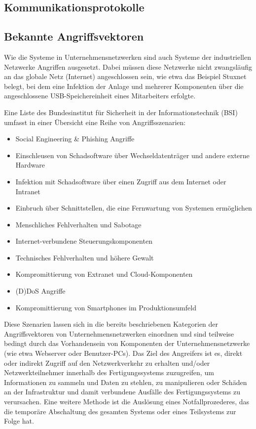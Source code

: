 \subsection{Kommunikationsprotokolle	}

\subsection{Bekannte Angriffsvektoren}
Wie die Systeme in Unternehmensnetzwerken sind auch Systeme der industriellen Netzwerke Angriffen ausgesetzt. Dabei müssen diese Netzwerke nicht zwangsläufig an das globale Netz (Internet) angeschlossen sein, wie etwa das Beispiel Stuxnet belegt, bei dem eine Infektion der Anlage und mehrerer Komponenten über die angeschlossene USB-Speichereinheit eines Mitarbeiters erfolgte.

Eine Liste des Bundesinstitut für Sicherheit in der Informationstechnik (BSI) \citep{IndAttVec1} umfasst in einer Übersicht eine Reihe von Angriffsszenarien:
\begin{itemize}
\item Social Engineering \& Phishing Angriffe
\item Einschleusen von Schadsoftware über Wechseldatenträger und andere externe Hardware
\item Infektion mit Schadsoftware über einen Zugriff aus dem Internet oder Intranet
\item Einbruch über Schnittstellen, die eine Fernwartung von Systemen ermöglichen
\item Menschliches Fehlverhalten und Sabotage
\item Internet-verbundene Steuerungskomponenten
\item Technisches Fehlverhalten und höhere Gewalt
\item Kompromittierung von Extranet und Cloud-Komponenten
\item (D)DoS Angriffe
\item Kompromittierung von Smartphones im Produktionsumfeld
\end{itemize}

Diese Szenarien lassen sich in die bereits beschriebenen Kategorien der Angriffsvektoren von Unternehmensnetzwerken einordnen und sind teilweise bedingt durch das Vorhandensein von Komponenten der Unternehmensnetzwerke (wie etwa Webserver oder Benutzer-PCs).
Das Ziel des Angreifers ist es, direkt oder indirekt Zugriff auf den Netzwerkverkehr zu erhalten und/oder Netzwerkteilnehmer innerhalb des Fertigungssystems zuzugreifen, um Informationen zu sammeln und Daten zu stehlen, zu manipulieren oder Schäden an der Infrastruktur und damit verbundene Ausfälle des Fertigungssystems zu verursachen. Eine weitere Methode ist die Auslösung eines Notfallprozederes, das die temporäre Abschaltung des gesamten Systems oder eines Teilsystems zur Folge hat.

